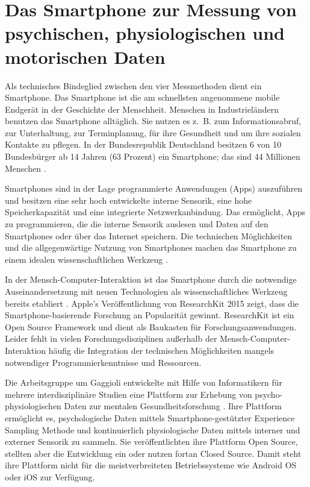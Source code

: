 

\section{Das Smartphone zur Messung von psychischen, physiologischen und motorischen Daten} 

\label{sec:das_smartphone_zur_messung_von_psychischen_physiologischen_und_motorischen_daten}

Als technisches Bindeglied zwischen den vier Messmethoden dient ein Smartphone. Das Smartphone ist die am schnellsten angenommene mobile Endgerät in der Geschichte der Menschheit. Menschen in Industrieländern benutzen das Smartphone alltäglich. Sie nutzen es z.~B. zum Informationsabruf, zur Unterhaltung, zur Terminplanung, für ihre Gesundheit und um ihre sozialen Kontakte zu pflegen. In der Bundesrepublik Deutschland besitzen 6 von 10 Bundesbürger ab 14 Jahren (63 Prozent) ein Smartphone; das sind 44 Millionen Menschen \citep[][]{bitkom2015}.

Smartphones sind in der Lage programmierte Anwendungen (Apps) auszuführen und besitzen eine sehr hoch entwickelte interne Sensorik, eine hohe Speicherkapazität und eine integrierte Netzwerkanbindung. Das ermöglicht, Apps zu programmieren, die die interne Sensorik auslesen und Daten auf den Smartphones oder über das Internet speichern. Die technischen Möglichkeiten und die allgegenwärtige Nutzung von Smartphones machen das Smartphone zu einem idealen wissenschaftlichen Werkzeug \citep[][]{Raento2009}.

In der Mensch-Computer-Interaktion ist das Smartphone durch die notwendige Auseinandersetzung mit neuen Technologien als wissenschaftliches Werkzeug bereits etabliert \citep{Froehlich2007}. Apple's Veröffentlichung von ResearchKit 2015 zeigt, dass die Smartphone-basierende Forschung an Popularität gewinnt. ResearchKit ist ein Open Source Framework und dient als Baukasten für Forschungsanwendungen. Leider fehlt in vielen Forschungsdisziplinen außerhalb der Mensch-Computer-Interaktion häufig die Integration der technischen Möglichkeiten mangels notwendiger Programmierkenntnisse und Ressourcen.

Die Arbeitsgruppe um Gaggioli entwickelte mit Hilfe von Informatikern für mehrere interdisziplinäre Studien eine Plattform zur Erhebung von psycho-physiologischen Daten zur mentalen Gesundheitsforschung \citep{Gaggioli2013}. Ihre Plattform ermöglicht es, psychologische Daten mittels Smartphone-gestützter Experience Sampling Methode und kontinuierlich physiologische Daten mittels interner und externer Sensorik zu sammeln. Sie veröffentlichten ihre Plattform Open Source, stellten aber die Entwicklung ein oder nutzen fortan Closed Source. Damit steht ihre Plattform nicht für die meistverbreiteten Betriebssysteme wie Android OS oder iOS zur Verfügung.

